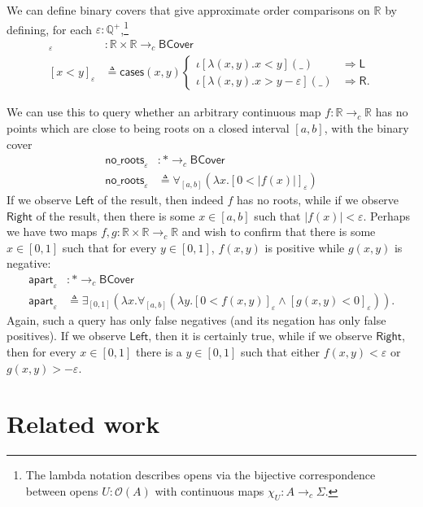 \documentclass[conference]{IEEEtran}
\newcommand{\cto}{\to_c}
\newcommand{\R}{\mathbb{R}}
\newcommand{\rat}{\mathbb{Q}}
\newcommand{\One}{\ast}
\newcommand{\Open}[1]{\mathcal{O}({#1})}
\newcommand{\wildcard}{\_}
\newcommand{\oinclf}[1]{\iota[{#1}]}
\newcommand{\oincl}[2]{\oinclf{#1} \left({#2}\right)}
\newcommand{\Branch}{\Rightarrow}
\begin{document}
We can define binary covers that give approximate order comparisons on $\R$ by defining, for each $\varepsilon : \rat^+$,\footnote{The lambda notation describes opens via the bijective correspondence between opens $U : \Open{A}$ with continuous maps $\chi_U : A \cto \Sigma$.}
\begin{align*}
[ \cdot < \cdot ]_\varepsilon &: \R \times \R \cto \mathsf{BCover}
\\ [x < y]_\varepsilon &\triangleq \mathsf{cases}(x, y)
\begin{cases}
\oincl{\lambda (x, y). x < y}{\wildcard} &\Branch \mathsf{L}
\\ \oincl{\lambda (x, y). x > y - \varepsilon}{\wildcard} &\Branch \mathsf{R}.
\end{cases}
\end{align*}

We can use this to query whether an arbitrary continuous map $f : \R \cto \R$ has no points which are close to being roots on a closed interval $[a, b]$, with the binary cover
\begin{align*}
\mathsf{no\_roots}_{\varepsilon} &: \One \cto \mathsf{BCover}
\\ \mathsf{no\_roots}_\varepsilon &\triangleq
  \forall_{[a,b]}(\lambda x. [ 0 < |f(x)| ]_\varepsilon)
\end{align*}
If we observe $\mathsf{Left}$ of the result, then indeed $f$ has no roots, while if we observe $\mathsf{Right}$ of the result, then there is some $x \in [a, b]$ such that $|f(x)| < \varepsilon$. Perhaps we have two maps $f, g : \R \times \R \cto \R$ and wish to confirm that there is some $x \in [0,1]$ such that for every $y \in [0,1]$, $f(x, y)$ is positive while $g(x,y)$ is negative:
\begin{align*}
\mathsf{apart}_{\varepsilon} &: \One \cto \mathsf{BCover}
\\ \mathsf{apart}_\varepsilon &\triangleq
  \exists_{[0,1]}(\lambda x. \forall_{[a,b]}(\lambda y. [ 0 < f(x, y) ]_\varepsilon \wedge [g(x, y) < 0]_\varepsilon)).
\end{align*}
Again, such a query has only false negatives (and its negation has only false positives). If we observe $\mathsf{Left}$, then it is certainly true, while if we observe $\mathsf{Right}$, then for every $x \in [0,1]$ there is a $y \in [0,1]$ such that either $f(x, y) < \varepsilon$ or $g(x, y) > -\varepsilon$.

\section{Related work}
\end{document}
